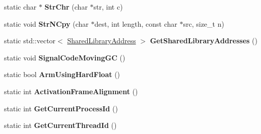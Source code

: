 \begin{DoxyCompactItemize}
\item 
static char $\ast$ {\bfseries Str\+Chr} (char $\ast$str, int c)\hypertarget{classv8_1_1base_1_1_o_s_abec10fefb549e2a4942a54f58a94c4bb}{}\label{classv8_1_1base_1_1_o_s_abec10fefb549e2a4942a54f58a94c4bb}

\item 
static void {\bfseries Str\+N\+Cpy} (char $\ast$dest, int length, const char $\ast$src, size\+\_\+t n)\hypertarget{classv8_1_1base_1_1_o_s_aa2d5f71adc225182f5266fb2e4db2251}{}\label{classv8_1_1base_1_1_o_s_aa2d5f71adc225182f5266fb2e4db2251}

\item 
static std\+::vector$<$ \hyperlink{structv8_1_1base_1_1_o_s_1_1_shared_library_address}{Shared\+Library\+Address} $>$ {\bfseries Get\+Shared\+Library\+Addresses} ()\hypertarget{classv8_1_1base_1_1_o_s_a9cf3746d7a51ec0026075a73469171bd}{}\label{classv8_1_1base_1_1_o_s_a9cf3746d7a51ec0026075a73469171bd}

\item 
static void {\bfseries Signal\+Code\+Moving\+GC} ()\hypertarget{classv8_1_1base_1_1_o_s_a13338b78af444988376b9ea52903b1c4}{}\label{classv8_1_1base_1_1_o_s_a13338b78af444988376b9ea52903b1c4}

\item 
static bool {\bfseries Arm\+Using\+Hard\+Float} ()\hypertarget{classv8_1_1base_1_1_o_s_a155958d2b20ee8b323dbc13cb496b981}{}\label{classv8_1_1base_1_1_o_s_a155958d2b20ee8b323dbc13cb496b981}

\item 
static int {\bfseries Activation\+Frame\+Alignment} ()\hypertarget{classv8_1_1base_1_1_o_s_ab5546854ab1604735a7ff8112651266a}{}\label{classv8_1_1base_1_1_o_s_ab5546854ab1604735a7ff8112651266a}

\item 
static int {\bfseries Get\+Current\+Process\+Id} ()\hypertarget{classv8_1_1base_1_1_o_s_a885bdc89bb37ed241b7e312597ad831a}{}\label{classv8_1_1base_1_1_o_s_a885bdc89bb37ed241b7e312597ad831a}

\item 
static int {\bfseries Get\+Current\+Thread\+Id} ()\hypertarget{classv8_1_1base_1_1_o_s_ab21ab688f2e6bcbeb2a40246967ec96f}{}\label{classv8_1_1base_1_1_o_s_ab21ab688f2e6bcbeb2a40246967ec96f}

\end{DoxyCompactItemize}
